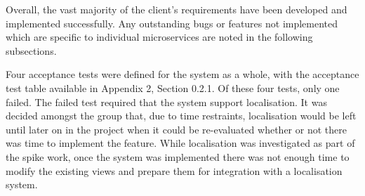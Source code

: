 Overall, the vast majority of the client's requirements have been developed and implemented successfully. Any outstanding bugs or features not implemented which are specific to individual microservices are noted in the following subsections.

Four acceptance tests were defined for the system as a whole, with the acceptance test table available in Appendix 2, Section 0.2.1. Of these four tests, only one failed. The failed test required that the system support localisation. It was decided amongst the group that, due to time restraints, localisation would be left until later on in the project when it could be re-evaluated whether or not there was time to implement the feature. While localisation was investigated as part of the spike work, once the system was implemented there was not enough time to modify the existing views and prepare them for integration with a localisation system.